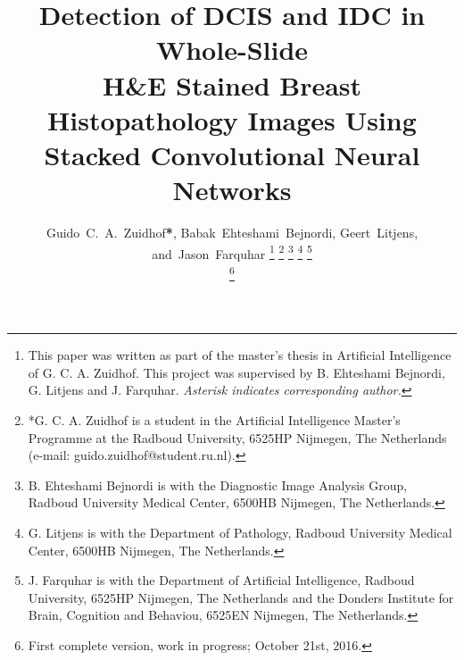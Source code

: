 \documentclass[journal]{IEEEtran}
\begin{document}
%
\title{Detection of DCIS and IDC in Whole-Slide\\ H\&E Stained Breast Histopathology Images Using Stacked Convolutional Neural Networks}
%
%
%

\author{Guido~C.~A.~Zuidhof\textbf{*},
        Babak~Ehteshami~Bejnordi,
        Geert~Litjens,
        and~Jason~Farquhar%
\thanks{This paper was written as part of the master's thesis in Artificial Intelligence of G. C. A. Zuidhof. This project was supervised by B. Ehteshami Bejnordi, G. Litjens and J. Farquhar. \textit{Asterisk indicates corresponding author.}}%
\thanks{*G. C. A. Zuidhof is a student in the Artificial Intelligence Master's Programme at the Radboud University, 6525HP Nijmegen, The Netherlands (e-mail: guido.zuidhof@student.ru.nl).}%
\thanks{B. Ehteshami Bejnordi is with the Diagnostic Image Analysis Group, Radboud University Medical Center, 6500HB Nijmegen, The Netherlands.}%
\thanks{G. Litjens is with the Department of Pathology, Radboud University Medical Center, 6500HB Nijmegen,
The Netherlands.}%
\thanks{J. Farquhar is with the Department of Artificial Intelligence, Radboud University, 6525HP Nijmegen,
The Netherlands and the Donders Institute for Brain, Cognition and Behaviou, 6525EN Nijmegen, The Netherlands.}%

\thanks{First complete version, work in progress; October 21st, 2016.}}
\end{document}

